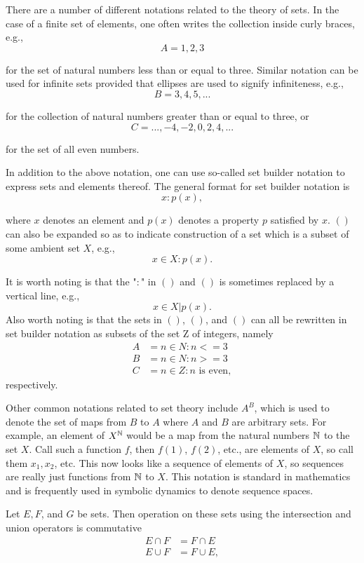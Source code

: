 
There are a number of different notations related to the theory of sets. In the case of a finite set of elements, one often writes the collection inside curly braces, e.g.,
\[A={1,2,3}\]

for the set of natural numbers less than or equal to three. Similar notation can be used for infinite sets provided that ellipses are used to signify infiniteness, e.g.,
\[B={3,4,5,...} 	\]

for the collection of natural numbers greater than or equal to three, or
\[C={...,-4,-2,0,2,4,...} 	\]

for the set of all even numbers.

In addition to the above notation, one can use so-called set builder notation to express sets and elements thereof. The general format for set builder notation is
\[{x:p(x)}, 	\]

where $x$ denotes an element and $p(x)$ denotes a property $p$ satisfied by $x$. $()$ can also be expanded so as to indicate construction of a set which is a subset of some ambient set $X$, e.g.,
\[{x \in X:p(x)}. 	\]



It is worth noting is that the "$:$" in $()$ and $()$ is sometimes replaced by a vertical line, e.g.,
\[{x \in X|p(x)}. 	\]
Also worth noting is that the sets in $()$, $()$, and $()$ can all be rewritten in set builder notation as subsets of the set Z of integers, namely
\begin{align*}
    A	&=	{n \in N:n<=3}	\\
    B	&=	{n \in N:n>=3}	\\
    C	&=	{n \in Z:n\text{ is even}},	
\end{align*}
respectively.

Other common notations related to set theory include $A^B$, which is used to denote the set of maps from $B$ to $A$ where $A$ and $B$ are arbitrary sets. 
For example, an element of $X^{\protect\mathbb N}$ would be a map from the natural numbers ${\protect\mathbb N}$ to the set $X$. 
Call such a function $f$, then $f(1)$, $f(2)$, etc., are elements of $X$, so call them $x_1, x_2$, etc. This now looks like a sequence of elements of $X$, so sequences are really just functions from ${\protect\mathbb N}$ to $X$. This notation is standard in mathematics and is frequently used in symbolic dynamics to denote sequence spaces.

Let $E, F$, and $G$ be sets. Then operation on these sets using the intersection and union operators is commutative
\begin{align*}
    E \cap F &= F \cap E \\	
    E \cup F &= F \cup E, 	
\end{align*}


